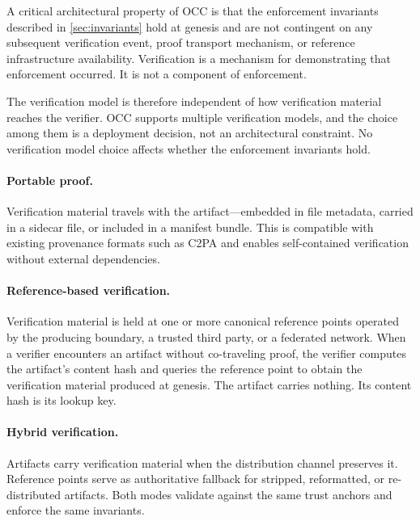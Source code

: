\documentclass[11pt,letterpaper]{article}
\theoremstyle{occplain}
\theoremstyle{occremark}
\begin{document}
A critical architectural property of OCC is that the enforcement invariants described in \cref{sec:invariants} hold at genesis and are not contingent on any subsequent verification event, proof transport mechanism, or reference infrastructure availability. Verification is a mechanism for demonstrating that enforcement occurred. It is not a component of enforcement.

The verification model is therefore independent of how verification material reaches the verifier. OCC supports multiple verification models, and the choice among them is a deployment decision, not an architectural constraint. No verification model choice affects whether the enforcement invariants hold.

\paragraph{Portable proof.}
Verification material travels with the artifact---embedded in file metadata, carried in a sidecar file, or included in a manifest bundle. This is compatible with existing provenance formats such as C2PA and enables self-contained verification without external dependencies.

\paragraph{Reference-based verification.}
Verification material is held at one or more canonical reference points operated by the producing boundary, a trusted third party, or a federated network. When a verifier encounters an artifact without co-traveling proof, the verifier computes the artifact's content hash and queries the reference point to obtain the verification material produced at genesis. The artifact carries nothing. Its content hash is its lookup key.

\paragraph{Hybrid verification.}
Artifacts carry verification material when the distribution channel preserves it. Reference points serve as authoritative fallback for stripped, reformatted, or re-distributed artifacts. Both modes validate against the same trust anchors and enforce the same invariants.
\end{document}
